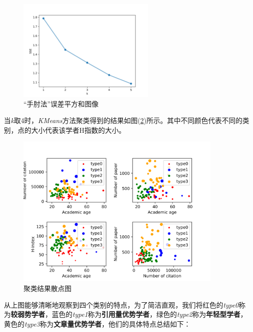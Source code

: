 \documentclass[lang=cn,11pt,a4paper,cite=authoryear]{elegantpaper}
\begin{document}
\begin{figure}[H]
	\centering
	\includegraphics[width=0.6\textwidth]{image/elb.png}
	\caption{“手肘法”误差平方和图像}
	\label{fig1}
\end{figure}

当\textit{k}取4时，\textit{KMeans}方法聚类得到的结果如图(\ref{fig2})所示。其中不同颜色代表不同的类别，点的大小代表该学者H指数的大小。

\begin{figure}[H]
	\centering
	\includegraphics[width=0.9\textwidth]{image/cluster_figure.png}
	\caption{聚类结果散点图}
	\label{fig2}
\end{figure}

从上图能够清晰地观察到四个类别的特点，为了简洁直观，我们将红色的\textit{type0}称为\textbf{较弱势学者}，蓝色的\textit{type1}称为\textbf{引用量优势学者}，绿色的\textit{type2}称为\textbf{年轻型学者}，黄色的\textit{type3}称为\textbf{文章量优势学者}，他们的具体特点总结如下：
\end{document}
